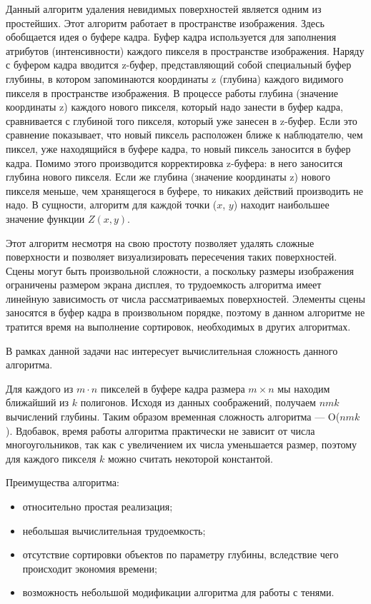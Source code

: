 Данный алгоритм удаления невидимых поверхностей является одним из простейших. Этот алгоритм работает в пространстве изображения. Здесь обобщается идея о буфере кадра. Буфер кадра используется для заполнения атрибутов (интенсивности) каждого пикселя в пространстве изображения. Наряду с буфером кадра вводится z-буфер, представляющий собой специальный буфер глубины, в котором запоминаются координаты z (глубина) каждого видимого пикселя в пространстве изображения. В процессе работы глубина (значение координаты z) каждого нового пикселя, который надо занести в буфер кадра, сравнивается с глубиной того пикселя, который уже занесен в z-буфер. Если это сравнение показывает, что новый пиксель расположен ближе к наблюдателю, чем пиксел, уже находящийся в буфере кадра, то новый пиксель заносится в буфер кадра. Помимо этого производится корректировка z-буфера: в него заносится глубина нового пикселя. Если же глубина (значение координаты z) нового пикселя меньше, чем хранящегося в буфере, то никаких действий производить не надо. В сущности, алгоритм для каждой точки ($x$, $y$) находит наибольшее значение функции $Z(x, y)$.

Этот алгоритм несмотря на свою простоту позволяет удалять сложные поверхности и позволяет визуализировать пересечения таких поверхностей. Сцены могут быть произвольной сложности, а поскольку размеры изображения ограничены размером экрана дисплея, то трудоемкость алгоритма имеет линейную зависимость от числа рассматриваемых поверхностей. Элементы сцены заносятся в буфер кадра в произвольном порядке, поэтому в данном алгоритме не тратится время на выполнение сортировок, необходимых в других алгоритмах.

В рамках данной задачи нас интересует вычислительная сложность данного алгоритма.

Для каждого из $m\cdot n$ пикселей в буфере кадра размера $m\times n$ мы находим ближайший из $k$ полигонов. Исходя из данных соображений, получаем $nmk$ вычислений глубины. Таким образом временная сложность алгоритма --- O($nmk$). Вдобавок, время работы алгоритма практически не зависит от числа многоугольников, так как с увеличением их числа уменьшается размер, поэтому для каждого пикселя $k$ можно считать некоторой константой.

Преимущества алгоритма:
\begin{itemize}[label=---]
    \item относительно простая реализация;
    \item небольшая вычислительная трудоемкость;
    \item отсутствие сортировки объектов по параметру глубины, вследствие чего происходит экономия времени;
    \item возможность небольшой модификации алгоритма для работы с тенями.
\end{itemize}

